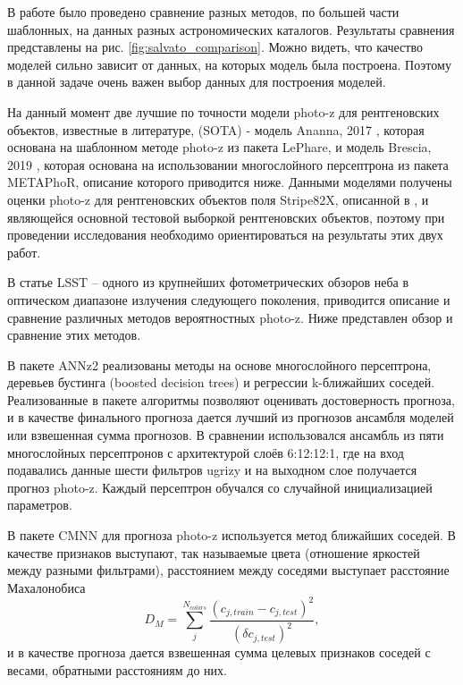 В работе \cite{bib:nature_photoz} было проведено сравнение разных методов, по большей части шаблонных, на данных разных астрономических каталогов. Результаты сравнения представлены на рис. \ref{fig:salvato_comparison}. Можно видеть, что качество моделей сильно зависит от данных, на которых модель была построена. Поэтому в данной задаче очень важен выбор данных для построения моделей.

На данный момент две лучшие по точности модели photo-z для рентгеновских объектов, известные в литературе, (SOTA) - модель Ananna, 2017 \cite{bib:ananna2017}, которая основана на шаблонном методе photo-z из пакета LePhare, и модель Brescia, 2019 \cite{bib:brescia2018}, которая основана на использовании многослойного персептрона из пакета METAPhoR, описание которого приводится ниже. Данными моделями получены оценки photo-z для рентгеновских объектов поля Stripe82X, описанной в \cite{bib:ananna2017}, и являющейся основной тестовой выборкой рентгеновских объектов, поэтому при проведении исследования необходимо ориентироваться на результаты этих двух работ.

В статье LSST -- одного из крупнейших фотометрических обзоров неба в оптическом диапазоне излучения следующего поколения, \cite{bib:lsst} приводится описание и сравнение различных методов вероятностных photo-z. Ниже представлен обзор и сравнение этих методов.

В пакете ANNz2 \cite{bib:annz2} реализованы методы на основе многослойного персептрона, деревьев бустинга (boosted decision trees) и регрессии k-ближайших соседей. Реализованные в пакете алгоритмы позволяют оценивать достоверность прогноза, и в качестве финального прогноза дается лучший из прогнозов ансамбля моделей или взвешенная сумма прогнозов. В сравнении использовался ансамбль из пяти многослойных персептронов с архитектурой слоёв 6:12:12:1, где на вход подавались данные шести фильтров ugrizy и на выходном слое получается прогноз photo-z. Каждый персептрон обучался со случайной инициализацией параметров.

В пакете CMNN \cite{bib:cmnn} для прогноза photo-z используется метод ближайших соседей. В качестве признаков выступают, так называемые цвета (отношение яркостей между разными фильтрами), расстоянием между соседями выступает расстояние Махалонобиса
\begin{equation}
    D_M = \sum_j^{N_{colors}} \frac{(c_{j,train} - c_{j,test})^2}{(\delta c_{j,test})^2},
\end{equation}
и в качестве прогноза дается взвешенная сумма целевых признаков соседей с весами, обратными расстояниям до них.

